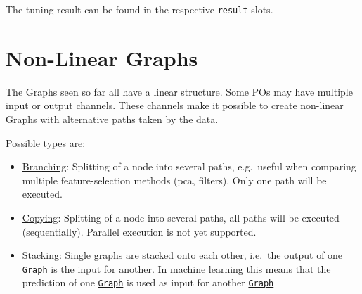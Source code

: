 \documentclass[
]{scrbook}
\newenvironment{Shaded}{\begin{snugshade}}{\end{snugshade}}
\newcommand{\FunctionTok}[1]{\textcolor[rgb]{0.00,0.00,0.00}{#1}}
\newcommand{\NormalTok}[1]{#1}
\newcommand{\OtherTok}[1]{\textcolor[rgb]{0.56,0.35,0.01}{#1}}
\newcommand{\SpecialCharTok}[1]{\textcolor[rgb]{0.00,0.00,0.00}{#1}}
\newcommand{\StringTok}[1]{\textcolor[rgb]{0.31,0.60,0.02}{#1}}
\providecommand{\tightlist}{%
  \setlength{\itemsep}{0pt}\setlength{\parskip}{0pt}}
\renewenvironment{Shaded} {\begin{snugshade}\small} {\end{snugshade}}
\begin{document}
\begin{Shaded}
\end{Shaded}

The tuning result can be found in the respective \texttt{result} slots.

\begin{Shaded}
\end{Shaded}

\hypertarget{pipe-nonlinear}{%
\section{Non-Linear Graphs}\label{pipe-nonlinear}}

The Graphs seen so far all have a linear structure.
Some POs may have multiple input or output channels.
These channels make it possible to create non-linear Graphs with alternative paths taken by the data.

Possible types are:

\begin{itemize}
\tightlist
\item
  \protect\hyperlink{pipe-model-ensembles-branching-copying}{Branching}:
  Splitting of a node into several paths, e.g.~useful when comparing multiple feature-selection methods (pca, filters).
  Only one path will be executed.
\item
  \protect\hyperlink{pipe-model-ensembles-branching-copying}{Copying}:
  Splitting of a node into several paths, all paths will be executed (sequentially).
  Parallel execution is not yet supported.
\item
  \protect\hyperlink{pipe-model-ensembles-stacking}{Stacking}:
  Single graphs are stacked onto each other, i.e.~the output of one \href{https://mlr3pipelines.mlr-org.com/reference/Graph.html}{\texttt{Graph}} is the input for another.
  In machine learning this means that the prediction of one \href{https://mlr3pipelines.mlr-org.com/reference/Graph.html}{\texttt{Graph}} is used as input for another \href{https://mlr3pipelines.mlr-org.com/reference/Graph.html}{\texttt{Graph}}
\end{itemize}
\end{document}
